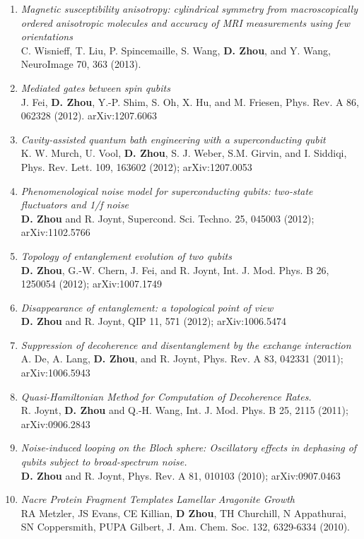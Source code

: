 \documentclass[centered,11pt,overlapped]{res}
\begin{document}
\begin{resume}
{\begin{enumerate}[leftmargin=-0.02in]
\item {\em Magnetic susceptibility anisotropy: cylindrical symmetry from macroscopically ordered anisotropic molecules and accuracy of MRI measurements using few orientations}\\
C. Wisnieff, T. Liu, P. Spincemaille, S. Wang, {\bf D. Zhou}, and Y. Wang,  NeuroImage 70, 363 (2013).
\item{\em Mediated gates between spin qubits} \\
J. Fei, {\bf D. Zhou}, Y.-P. Shim, S. Oh, X. Hu, and M. Friesen, Phys. Rev. A 86, 062328 (2012). arXiv:1207.6063
\item{\em Cavity-assisted quantum bath engineering with a superconducting qubit}\\
K. W. Murch, U. Vool, {\bf D. Zhou}, S. J. Weber, S.M. Girvin, and I. Siddiqi,
Phys. Rev. Lett. 109, 163602 (2012); arXiv:1207.0053
\item{\em Phenomenological noise model for superconducting qubits:
two-state fluctuators and 1/f noise}\\
{\bf D. Zhou} and R. Joynt, Supercond. Sci. Techno. 25, 045003 (2012); arXiv:1102.5766
\item{\em Topology of entanglement evolution of two qubits}\\
{\bf D. Zhou}, G.-W. Chern, J. Fei, and R. Joynt, Int. J. Mod. Phys. B 26, 1250054 (2012); arXiv:1007.1749
\item{\em Disappearance of entanglement: a topological point of view} \\
{\bf D. Zhou} and R. Joynt, QIP 11, 571 (2012); arXiv:1006.5474
\item{\em Suppression of decoherence and disentanglement by the exchange interaction}\\
A. De, A. Lang, {\bf D. Zhou}, and R. Joynt, Phys. Rev. A 83, 042331 (2011); arXiv:1006.5943
\item {\em Quasi-Hamiltonian Method for Computation of Decoherence Rates.}\\
R. Joynt, {\bf D. Zhou} and Q.-H. Wang, Int. J. Mod. Phys. B 25, 2115 (2011); arXiv:0906.2843
\item {\em Noise-induced looping on the Bloch sphere: Oscillatory effects in dephasing of qubits subject to broad-spectrum noise.}\\
{\bf D. Zhou} and R. Joynt, Phys. Rev. A 81, 010103 (2010); arXiv:0907.0463
\item {\em Nacre Protein Fragment Templates Lamellar Aragonite Growth}\\
RA Metzler, JS Evans, CE Killian, {\bf D Zhou}, TH Churchill, N Appathurai, SN Coppersmith, PUPA Gilbert, J. Am. Chem. Soc. 132, 6329-6334 (2010).

\end{enumerate}}
\end{resume}
\end{document}
